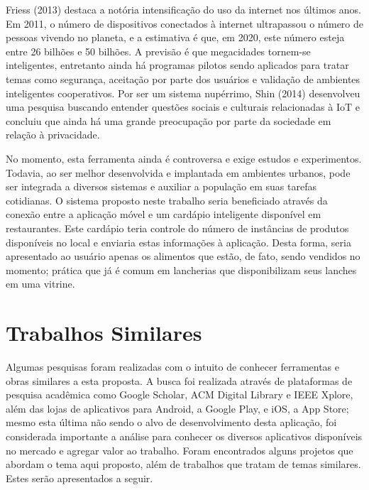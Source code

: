 Friess (2013) destaca a notória intensificação do uso da internet nos últimos anos. Em 2011, o número de dispositivos conectados à internet ultrapassou o número de pessoas vivendo no planeta, e a estimativa é que, em 2020, este número esteja entre 26 bilhões e 50 bilhões. A previsão é que megacidades tornem-se inteligentes, entretanto ainda há programas pilotos sendo aplicados para tratar temas como segurança, aceitação por parte dos usuários e validação de ambientes inteligentes cooperativos. Por ser um sistema nupérrimo, Shin (2014) desenvolveu uma pesquisa buscando entender questões sociais e culturais relacionadas à IoT e concluiu que ainda há uma grande preocupação por parte da sociedade em relação à privacidade.

No momento, esta ferramenta ainda é controversa e exige estudos e experimentos. Todavia, ao ser melhor desenvolvida e implantada em ambientes urbanos, pode ser integrada a diversos sistemas e auxiliar a população em suas tarefas cotidianas. O sistema proposto neste trabalho seria beneficiado através da conexão entre a aplicação móvel e um cardápio inteligente disponível em restaurantes. Este cardápio teria controle do número de instâncias de produtos disponíveis no local e enviaria estas informações à aplicação. Desta forma, seria apresentado ao usuário apenas os alimentos que estão, de fato, sendo vendidos no momento; prática que já é comum em lancherias que disponibilizam seus lanches em uma vitrine.


\section{Trabalhos Similares}
Algumas pesquisas foram realizadas com o intuito de conhecer ferramentas e obras similares a esta proposta. A busca foi realizada através de plataformas de pesquisa acadêmica como Google Scholar, ACM Digital Library e IEEE Xplore, além das lojas de aplicativos para Android, a Google Play, e iOS, a App Store; mesmo esta última não sendo o alvo de desenvolvimento desta aplicação, foi considerada importante a análise para conhecer os diversos aplicativos disponíveis no mercado e agregar valor ao trabalho. Foram encontrados alguns projetos que abordam o tema aqui proposto, além de trabalhos que tratam de temas similares. Estes serão apresentados a seguir.


